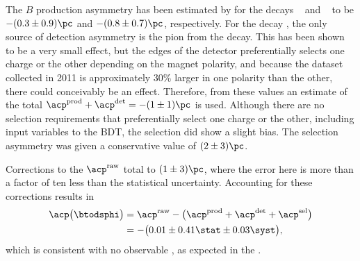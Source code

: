 The $B$ production asymmetry has been estimated by \lhcb for the decays
\decay{\Bp}{\jpsi\pip}~\cite{LHCb-PAPER-2011-024} and
\decay{\Bp}{\Dz\Kp}~\cite{LHCb-PAPER-2012-001} to be
$-(0.3\pm0.9)\pc$ and $-(0.8\pm0.7)\pc$, respectively.
For the decay \btodsphi, the only source of detection asymmetry is the pion from the \Ds decay.
This has been shown to be a very small effect, but the edges of the detector preferentially selects
one charge or the other depending on the magnet polarity, and because the dataset collected in 2011
is approximately $30\%$ larger in one polarity than the other, there could conceivably be an effect.
Therefore, from these values an estimate of the total
$\acp^\mathrm{prod} + \acp^\mathrm{det}=-(1\pm1)\pc$ is used.
Although there are no selection requirements that preferentially select one charge or the other,
including input variables to the BDT, the selection did show a slight bias.
The selection asymmetry was given a conservative value of $(2\pm3)\pc$.

Corrections to the $\acp^\mathrm{raw}$ total to $(1\pm3)\pc$, where the error here is more than a
factor of ten less than the statistical uncertainty.
Accounting for these corrections results in
\begin{align}
  \acp\big(\btodsphi\big)&=
  \acp^\mathrm{raw} - \big(\acp^\mathrm{prod} + \acp^\mathrm{det} +
  \acp^\mathrm{sel}\big)\nonumber\\
  &=
  -\big(0.01\pm0.41\stat\pm0.03\syst\big),
\end{align}
which is consistent with no observable \CPV, as expected in the \sm.



